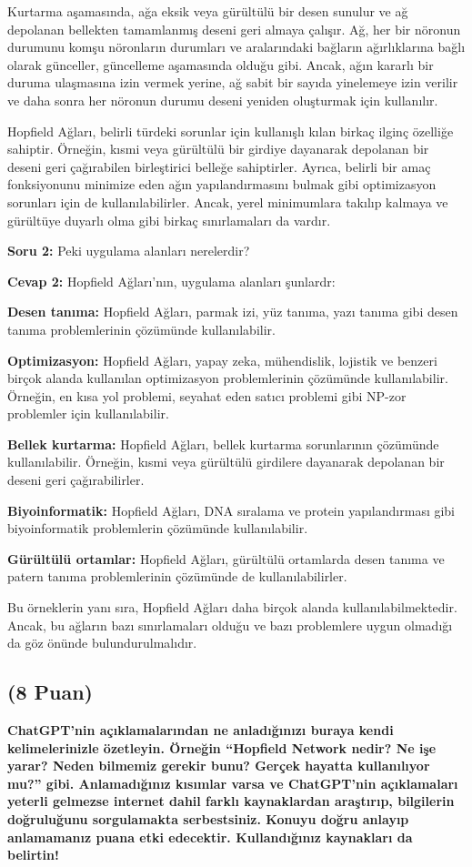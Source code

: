 \documentclass[11pt]{article}
\begin{document}
Kurtarma aşamasında, ağa eksik veya gürültülü bir desen sunulur ve ağ depolanan bellekten tamamlanmış deseni geri almaya çalışır. Ağ, her bir nöronun durumunu komşu nöronların durumları ve aralarındaki bağların ağırlıklarına bağlı olarak günceller, güncelleme aşamasında olduğu gibi. Ancak, ağın kararlı bir duruma ulaşmasına izin vermek yerine, ağ sabit bir sayıda yinelemeye izin verilir ve daha sonra her nöronun durumu deseni yeniden oluşturmak için kullanılır.

Hopfield Ağları, belirli türdeki sorunlar için kullanışlı kılan birkaç ilginç özelliğe sahiptir. Örneğin, kısmi veya gürültülü bir girdiye dayanarak depolanan bir deseni geri çağırabilen birleştirici belleğe sahiptirler. Ayrıca, belirli bir amaç fonksiyonunu minimize eden ağın yapılandırmasını bulmak gibi optimizasyon sorunları için de kullanılabilirler. Ancak, yerel minimumlara takılıp kalmaya ve gürültüye duyarlı olma gibi birkaç sınırlamaları da vardır.

\textbf{Soru 2:} Peki uygulama alanları nerelerdir?

\textbf{Cevap 2:} Hopfield Ağları'nın, uygulama alanları şunlardr:

\textbf{Desen tanıma:} Hopfield Ağları, parmak izi, yüz tanıma, yazı tanıma gibi desen tanıma problemlerinin çözümünde kullanılabilir.

\textbf{Optimizasyon:} Hopfield Ağları, yapay zeka, mühendislik, lojistik ve benzeri birçok alanda kullanılan optimizasyon problemlerinin çözümünde kullanılabilir. Örneğin, en kısa yol problemi, seyahat eden satıcı problemi gibi NP-zor problemler için kullanılabilir.

\textbf{Bellek kurtarma:} Hopfield Ağları, bellek kurtarma sorunlarının çözümünde kullanılabilir. Örneğin, kısmi veya gürültülü girdilere dayanarak depolanan bir deseni geri çağırabilirler.

\textbf{Biyoinformatik:} Hopfield Ağları, DNA sıralama ve protein yapılandırması gibi biyoinformatik problemlerin çözümünde kullanılabilir.

\textbf{Gürültülü ortamlar:} Hopfield Ağları, gürültülü ortamlarda desen tanıma ve patern tanıma problemlerinin çözümünde de kullanılabilirler.

Bu örneklerin yanı sıra, Hopfield Ağları daha birçok alanda kullanılabilmektedir. Ancak, bu ağların bazı sınırlamaları olduğu ve bazı problemlere uygun olmadığı da göz önünde bulundurulmalıdır.
\newpage
\subsection{(8 Puan)} \textbf{ChatGPT’nin açıklamalarından ne anladığınızı buraya kendi kelimelerinizle özetleyin. Örneğin ``Hopfield Network nedir? Ne işe yarar? Neden bilmemiz gerekir bunu? Gerçek hayatta kullanılıyor mu?'' gibi. Anlamadığınız kısımlar varsa ve ChatGPT’nin açıklamaları yeterli gelmezse internet dahil farklı kaynaklardan araştırıp, bilgilerin doğruluğunu sorgulamakta serbestsiniz. Konuyu doğru anlayıp anlamamanız puana etki edecektir. Kullandığınız kaynakları da belirtin!}
\end{document}
